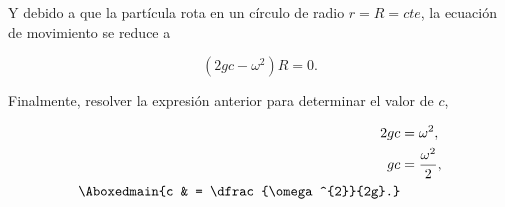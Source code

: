 \documentclass[../main.tex]{subfiles}
\begin{document}
\begin{problema}
	Y debido a que la partícula rota en un círculo de radio \(r = R = cte\), la
	ecuación de movimiento se reduce a

	\begin{equation*}
		(2gc - \omega^{2})R = 0.
	\end{equation*}

	Finalmente, resolver la expresión anterior para determinar el valor de \(c\),

	\begin{align*}
		2gc           & = \omega^{2},              \\
		gc            & = \dfrac{\omega^{2}}{2},   \\
		\Aboxedmain{c & = \dfrac{\omega^{2}}{2g}.}
	\end{align*}
\end{problema}
\end{document}
